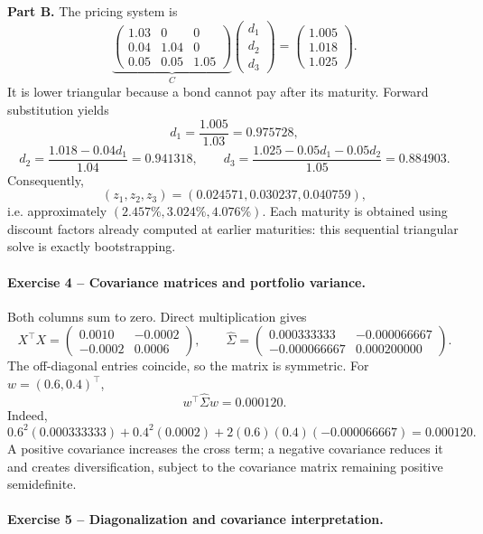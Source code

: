 \documentclass[10pt]{article}
\begin{document}
\textbf{Part B.} The pricing system is
\[
\underbrace{\begin{pmatrix}
1.03&0&0\\0.04&1.04&0\\0.05&0.05&1.05
\end{pmatrix}}_{C}
\begin{pmatrix}d_1\\d_2\\d_3\end{pmatrix}
=\begin{pmatrix}1.005\\1.018\\1.025\end{pmatrix}.
\]
It is lower triangular because a bond cannot pay after its maturity. Forward
substitution yields
\[
d_1=\frac{1.005}{1.03}=0.975728,
\]
\[
d_2=\frac{1.018-0.04d_1}{1.04}=0.941318,
\qquad
d_3=\frac{1.025-0.05d_1-0.05d_2}{1.05}=0.884903.
\]
Consequently,
\[
(z_1,z_2,z_3)=(0.024571,0.030237,0.040759),
\]
i.e. approximately $(2.457\%,3.024\%,4.076\%)$. Each maturity is obtained
using discount factors already computed at earlier maturities: this sequential
triangular solve is exactly bootstrapping.

\paragraph{Exercise 4 -- Covariance matrices and portfolio variance.}

Both columns sum to zero. Direct multiplication gives
\[
X^\top X=\begin{pmatrix}0.0010&-0.0002\\-0.0002&0.0006\end{pmatrix},
\qquad
\widehat\Sigma=\begin{pmatrix}
0.000333333&-0.000066667\\
-0.000066667&0.000200000
\end{pmatrix}.
\]
The off-diagonal entries coincide, so the matrix is symmetric. For
$w=(0.6,0.4)^\top$,
\[
w^\top\widehat\Sigma w=0.000120.
\]
Indeed,
\[
0.6^2(0.000333333)+0.4^2(0.0002)
+2(0.6)(0.4)(-0.000066667)
=0.000120.
\]
A positive covariance increases the cross term; a negative covariance reduces
it and creates diversification, subject to the covariance matrix remaining
positive semidefinite.

\paragraph{Exercise 5 -- Diagonalization and covariance interpretation.}
\end{document}
